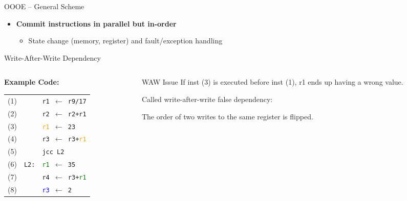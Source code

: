 \documentclass[aspectratio=169,12pt]{beamer}
\begin{document}
\begin{frame}{OOOE -- General Scheme}
\begin{itemize}
    \item \textbf{Commit instructions in parallel but in-order}
    \begin{itemize}
      \item State change (memory, register) and fault/exception handling
    \end{itemize}
  \end{itemize}
\end{frame}

\begin{frame}{Write-After-Write Dependency}
  \begin{columns}
    \begin{column}{0.5\textwidth}
      \textbf{Example Code:} \\
      \begin{tabular}{lll}
        (1) & & \texttt{\textcolor{r1color}{r1} $\leftarrow$ r9/17} \\
        (2) & & \texttt{\textcolor{r2color}{r2} $\leftarrow$ \textcolor{r2color}{r2}+\textcolor{r1color}{r1}} \\
        (3) & & \texttt{\textcolor{orange}{r1} $\leftarrow$ 23} \\
        (4) & & \texttt{\textcolor{r3color}{r3} $\leftarrow$ \textcolor{r3color}{r3}+\textcolor{orange}{r1}} \\
        (5) & & \texttt{jcc L2} \\
        (6) & \texttt{L2:} & \texttt{\textcolor{green}{r1} $\leftarrow$ 35} \\
        (7) & & \texttt{\textcolor{r4color}{r4} $\leftarrow$ \textcolor{r3color}{r3}+\textcolor{green}{r1}} \\
        (8) & & \texttt{\textcolor{blue}{r3} $\leftarrow$ 2} \\
      \end{tabular}
    \end{column}
    
    \begin{column}{0.5\textwidth}
      \begin{block}{WAW Issue}
        If inst (3) is executed before inst (1), r1 ends up having a wrong value.
        
        \vspace{0.3cm}
        
        Called \alert{write-after-write false dependency}:
        
        The order of two writes to the same register is flipped.
      \end{block}
    \end{column}
  \end{columns}
\end{frame}
\end{document}
